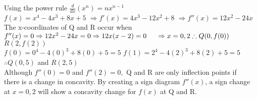 \documentclass{homework}
\begin{document}
\begin{flushleft}
\begin{paracol}{2}
    Using the power rule $\frac{d}{dx}(x^{n})=nx^{n-1}$ \vspace{0.4em} \\
    $ f(x)= x^4-4x^3+8x+5 $\vspace{0.4em} \linebreak 
    $\Rightarrow f'(x)=4x^3-12x^2+8 $\vspace{0.4em} \linebreak 
    $\Rightarrow f''(x)=12x^2-24x $ \vspace{1.4em} 
    \linebreak 
    The x-coordinates of Q and R occur when $f''(x)=0 \vspace{0.4em} \linebreak
    \Rightarrow 12x^{2}-24x=0 \vspace{0.4em} \linebreak
    \Rightarrow 12x(x-2)=0 \hspace{1.4em}
    \Rightarrow x=0,2  \vspace{0.4em} \linebreak
    \therefore Q(0, f(0)) $  $ R(2, f(2)) $  \vspace{1.4em} \\
     \vspace{0.4em} \linebreak
    $ f(0)= 0^4-4(0)^3+8(0)+5=5$ \vspace{0.4em}  \linebreak
     $f(1)= 2^4-4(2)^3+8(2)+5=5$ \vspace{0.4em}  \linebreak 
      $ \therefore Q(0, 5) $ and $R(2, 5)$ \vspace{1.4em} \\
      Although $f''(0)=0$ and $f''(2)=0,$ Q and R are only inflection points if there is a change in concavity. By creating a sign diagram $f''(x)$, a sign change at $x=0,2$ will show a concavity change for $f(x)$ at Q and R. \vspace{1.4em} \\
\end{paracol}
\end{flushleft}
\end{document}
